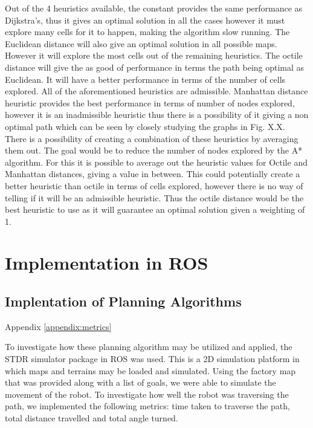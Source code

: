 \documentclass[a4paper,12pt]{article}
\begin{document}
				Out of the 4 heuristics available, the constant provides the same performance as Dijkstra’s, thus it gives an optimal solution in all the cases however it must explore many cells for it to happen, making the algorithm slow running. The Euclidean distance will also give an optimal solution in all possible maps. However it will explore the most cells out of the remaining heuristics. The octile distance will give the as good of performance in terms the path being optimal as Euclidean. It will have a better performance in terms of the number of cells explored. All of the aforementioned heuristics are admissible. Manhattan distance heuristic provides the best performance in terms of number of nodes explored, however it is an inadmissible heuristic thus there is a possibility of it giving a non optimal path which can be seen by closely studying the graphs in Fig. X.X.
				\\
				There is a possibility of creating a combination of these heuristics by averaging them out. The goal would be to reduce the number of nodes explored by the A* algorithm. For this it is possible to average out the heuristic values for Octile and Manhattan distances, giving a value in between. This could potentially create a better heuristic than octile in terms of cells explored, however there is no way of telling if it will be an admissible heuristic. Thus the octile distance would be the best heuristic to use as it will guarantee an optimal solution given a weighting of 1. 

	\section{Implementation in ROS}
	
		\subsection{Implentation of Planning Algorithms}
		Appendix \ref{appendix:metrics} 
			
			To investigate how these planning algorithm may be utilized and applied, the STDR simulator package in ROS was used. This is a 2D simulation platform in which maps and terrains may be loaded and simulated. Using the factory map that was provided along with a list of goals, we were able to simulate the movement of the robot. To investigate how well the robot was traversing the path, we implemented the following metrics: time taken to traverse the path, total distance travelled and total angle turned. 
			
\end{document}
